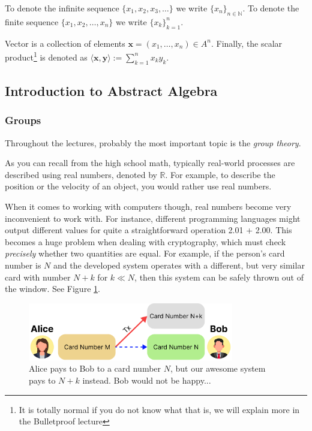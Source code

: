 \documentclass[../lecture-notes.tex]{subfiles}
\begin{document}
To denote the infinite sequence $\{x_1,x_2,x_3,\dots\}$ we write $\{x_n\}_{n \in \mathbb{N}}$. To denote the finite sequence $\{x_1,x_2,\dots,x_n\}$ we write $\{x_k\}_{k=1}^n$. 

Vector is a collection of elements $\mathbf{x} = (x_1,\dots,x_n) \in A^n$. Finally, the scalar product\footnote{It is totally normal if you do not know what that is, we will explain more in the Bulletproof lecture} is denoted as $\langle \mathbf{x}, \mathbf{y} \rangle := \sum_{k=1}^n x_ky_k$.

\subsection{Introduction to Abstract Algebra}

\subsubsection{Groups}

Throughout the lectures, probably the most important topic is the \textit{group theory}. 

As you can recall from the high school math, typically real-world processes are described using real numbers, denoted by $\mathbb{R}$. For example, to describe the position or the velocity of an object, you would rather use real numbers. 

When it comes to working with computers though, real numbers become very inconvenient to work with. For instance, different programming languages might output different values for quite a straightforward operation \textsf{2.01 + 2.00}. This becomes a huge problem when dealing with cryptography, which must check \textit{precisely} whether two quantities are equal. 
For example, if the person's card number is $N$ and the developed system operates with a different, but very similar card with number $N + k$ for $k \ll N$, then this system can be safely thrown out of the window. See Figure \ref{fig:why_integers}.

\begin{figure}[H]
    \centering
    \includegraphics[width=0.8\textwidth]{images/lecture_1/why_integers.pdf}
    \caption{Alice pays to Bob to a card number $N$, but our awesome system pays to $N+k$ instead. Bob would not be happy...}
    \label{fig:why_integers}
\end{figure}
\end{document}
